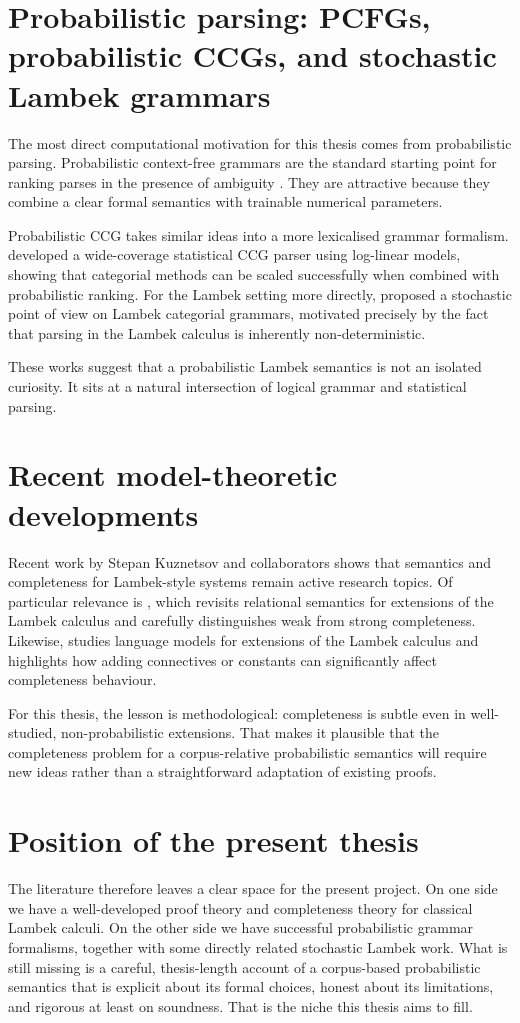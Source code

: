 \documentclass[12pt,a4paper]{report}
\theoremstyle{definition}
\begin{document}
\section{Probabilistic parsing: PCFGs, probabilistic CCGs, and stochastic Lambek grammars}
The most direct computational motivation for this thesis comes from probabilistic parsing.
Probabilistic context-free grammars are the standard starting point for ranking parses in the
presence of ambiguity \citep{ManningSchutze1999}. They are attractive because they combine a
clear formal semantics with trainable numerical parameters.

Probabilistic CCG takes similar ideas into a more lexicalised grammar formalism.
\citet{ClarkCurran2007} developed a wide-coverage statistical CCG parser using log-linear models,
showing that categorial methods can be scaled successfully when combined with probabilistic
ranking. For the Lambek setting more directly, \citet{BonfanteDeGroote2004} proposed a
stochastic point of view on Lambek categorial grammars, motivated precisely by the fact that
parsing in the Lambek calculus is inherently non-deterministic.

These works suggest that a probabilistic Lambek semantics is not an isolated curiosity. It sits at
a natural intersection of logical grammar and statistical parsing.

\section{Recent model-theoretic developments}
Recent work by Stepan Kuznetsov and collaborators shows that semantics and completeness for
Lambek-style systems remain active research topics. Of particular relevance is
\citet{Kuznetsov2023}, which revisits relational semantics for extensions of the Lambek calculus
and carefully distinguishes weak from strong completeness. Likewise,
\citet{KanovichKuznetsovScedrov2022} studies language models for extensions of the Lambek
calculus and highlights how adding connectives or constants can significantly affect completeness
behaviour.

For this thesis, the lesson is methodological: completeness is subtle even in well-studied,
non-probabilistic extensions. That makes it plausible that the completeness problem for a
corpus-relative probabilistic semantics will require new ideas rather than a straightforward
adaptation of existing proofs.

\section{Position of the present thesis}
The literature therefore leaves a clear space for the present project. On one side we have a
well-developed proof theory and completeness theory for classical Lambek calculi. On the other
side we have successful probabilistic grammar formalisms, together with some directly related
stochastic Lambek work. What is still missing is a careful, thesis-length account of a
corpus-based probabilistic semantics that is explicit about its formal choices, honest about its
limitations, and rigorous at least on soundness. That is the niche this thesis aims to fill.
\end{document}
